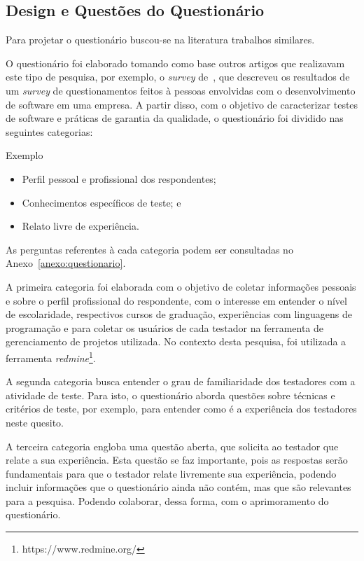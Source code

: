 \subsection{Design e Questões do Questionário}
\label{sec:desingquestions}

Para projetar o questionário buscou-se na literatura trabalhos similares.

O questionário foi elaborado tomando como base outros artigos que realizavam este tipo de pesquisa, por exemplo, o \textit{survey} de~\cite{geras2004survey}, que descreveu os resultados de um \textit{survey} de questionamentos feitos à pessoas envolvidas com o desenvolvimento de software em uma empresa. A partir disso, com o objetivo de caracterizar testes de software e práticas de garantia da qualidade, o questionário foi dividido nas seguintes categorias:

Exemplo \cite{model1980multiprocessing}

\begin{itemize}
\item  Perfil pessoal e profissional dos respondentes;
\item  Conhecimentos específicos de teste; e
\item  Relato livre de experiência.
\end{itemize}

As perguntas referentes à cada categoria podem ser consultadas no Anexo~\ref{anexo:questionario}.

A primeira categoria foi elaborada com o objetivo de coletar informações pessoais e sobre o perfil profissional do respondente, com o interesse em entender o nível de escolaridade, respectivos cursos de graduação, experiências com linguagens de programação e para coletar os usuários de cada testador na ferramenta de gerenciamento de projetos utilizada. No contexto desta pesquisa, foi utilizada a ferramenta \textit{redmine}\footnote{https://www.redmine.org/}.

A segunda categoria busca entender o grau de familiaridade dos testadores com a atividade de teste. Para isto, o questionário aborda questões sobre técnicas e critérios de teste, por exemplo, para entender como é a experiência dos testadores neste quesito.


A terceira categoria engloba uma questão aberta, que solicita ao testador que relate a sua experiência. Esta questão se faz importante, pois as respostas serão fundamentais para que o testador relate livremente sua experiência, podendo incluir informações que o questionário ainda não contém, mas que são relevantes para a pesquisa. Podendo colaborar, dessa forma, com o aprimoramento do questionário.

